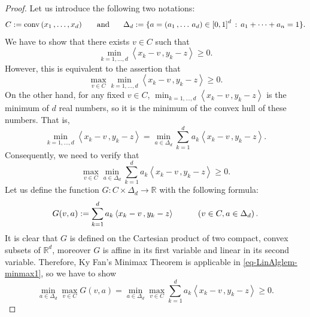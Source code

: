 \documentclass[12pt]{amsart}
\theoremstyle{remark}
\theoremstyle{definition}
\newcommand{\RR}{\mathbb{R}}
\newcommand{\conv}{\mbox{\rm conv}}
\newcommand{\map}{\longrightarrow}
\newcommand{\bsz}[2]{\left \langle #1 \,, #2 \right \rangle}
\begin{document}
\begin{proof}
Let us introduce the following two notations: 
\[
C:= \conv \left( x_1 \,, \dots , x_d \right) 
\hspace{5mm} \mbox{ and } \hspace{5mm} 
\Delta_d := 
\lbrace a = 
\left( a_1 \,, \dots \,a_d \right) \in \left[ 0,1 \right]^d 
\, : \, a_1 + \dots + a_n = 1 \rbrace. 
\] 
We have to show that there exists $ v \in C $ 
such that 
\[
\min_{k=1, \dots , d} 
\bsz{x_k-v}{y_k-z} \geq 0. 
\]
However, this is equivalent to the assertion that 
\[
\max_{v \in C} \min_{k=1, \dots , d} 
\bsz{x_k-v}{y_k-z} \geq 0. 
\]
On the other hand, for any fixed $ v \in C $, 
$ \min_{k=1, \dots , d} \bsz{x_k-v}{y_k-z} $ is the 
minimum of $ d $ real numbers, so it is the minimum 
of the convex hull of these numbers. That is, 
\[
\min_{k=1, \dots , d} \bsz{x_k-v}{y_k-z} = 
\min_{a \in \Delta_d} 
\sum_{k=1}^d a_k \bsz{x_k-v}{y_k-z}. 
\]
Consequently, we need to verify that 
\begin{equation}\label{eq-LinAlglem-minmax1} 
\max_{v \in C} \min_{a \in \Delta_d} 
\sum_{k=1}^d a_k \bsz{x_k-v}{y_k-z} \geq 0. 
\end{equation}
Let us define the function $ G : C \times \Delta_d 
\map \RR $ with the following formula: 
\[
G(v,a) := \sum_{k=1}^d a_k \bsz{x_k-v}{y_k-z} 
\hspace{10mm} \left( v \in C, a \in \Delta_d \right).  
\]
It is clear that $ G $ is defined on the Cartesian product 
of two compact, convex subsets of $ \RR^d $, moreover 
$ G $ is affine in its first variable and 
linear in its second variable. Therefore, 
Ky Fan's Minimax Theorem \cite{Fan53} is applicable in 
\eqref{eq-LinAlglem-minmax1}, so we have to 
show 
\begin{equation}\label{eq-LinAlglem-minmax2} 
\min_{a \in \Delta_d} \max_{v \in C} 
G(v,a) 
= 
\min_{a \in \Delta_d} \max_{v \in C} 
\sum_{k=1}^d a_k \bsz{x_k-v}{y_k-z} \geq 0. 
\end{equation}


\end{proof}
\end{document}
